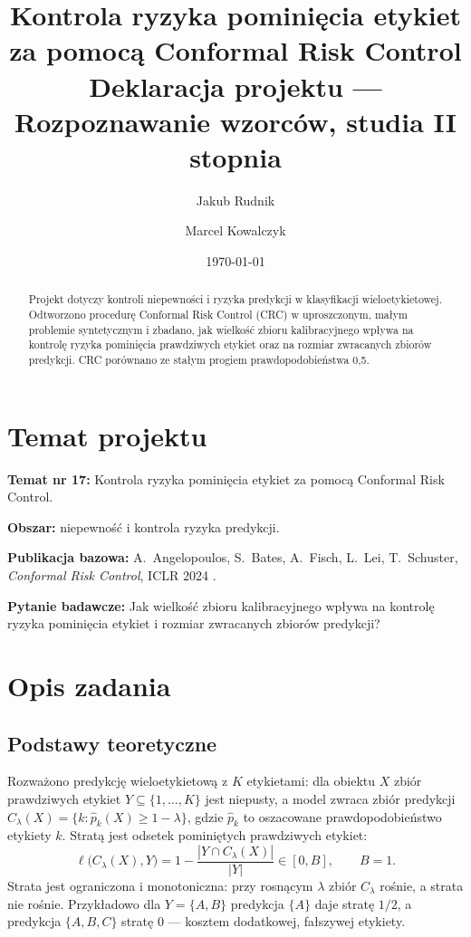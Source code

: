 \documentclass[10pt]{article}
\newcommand{\autorA}{{Jakub Rudnik}}
\newcommand{\autorB}{{Marcel Kowalczyk}}
\begin{document}
\title{Kontrola ryzyka pominięcia etykiet za pomocą Conformal Risk Control\\[0.5em]
\large Deklaracja projektu --- Rozpoznawanie wzorców, studia II stopnia}
\author{\autorA \and \autorB}
\date{\today}

\maketitle

\begin{abstract}

Projekt dotyczy kontroli niepewności i ryzyka predykcji w klasyfikacji wieloetykietowej.
Odtworzono procedurę Conformal Risk Control (CRC) \cite{CRC} w uproszczonym, małym
problemie syntetycznym i zbadano, jak wielkość zbioru kalibracyjnego wpływa na kontrolę
ryzyka pominięcia prawdziwych etykiet oraz na rozmiar zwracanych zbiorów predykcji.
CRC porównano ze stałym progiem prawdopodobieństwa 0{,}5.

\end{abstract}

\pagebreak

\section{Temat projektu}

\textbf{Temat nr 17:} Kontrola ryzyka pominięcia etykiet za pomocą Conformal Risk Control.

\noindent\textbf{Obszar:} niepewność i kontrola ryzyka predykcji.

\noindent\textbf{Publikacja bazowa:} A.~Angelopoulos, S.~Bates, A.~Fisch, L.~Lei,
T.~Schuster, \emph{Conformal Risk Control}, ICLR 2024 \cite{CRC}.

\noindent\textbf{Pytanie badawcze:} Jak wielkość zbioru kalibracyjnego wpływa na kontrolę
ryzyka pominięcia etykiet i rozmiar zwracanych zbiorów predykcji?

\section{Opis zadania}

\subsection{Podstawy teoretyczne}

Rozważono predykcję wieloetykietową z $K$ etykietami: dla obiektu $X$ zbiór prawdziwych
etykiet $Y \subseteq \{1,\dots,K\}$ jest niepusty, a model zwraca zbiór predykcji
$C_\lambda(X) = \{k : \hat p_k(X) \ge 1-\lambda\}$, gdzie $\hat p_k$ to oszacowane
prawdopodobieństwo etykiety $k$. Stratą jest odsetek pominiętych prawdziwych etykiet:
\[
  \ell\bigl(C_\lambda(X), Y\bigr) = 1 - \frac{|Y \cap C_\lambda(X)|}{|Y|} \in [0, B], \qquad B = 1 .
\]
Strata jest ograniczona i monotoniczna: przy rosnącym $\lambda$ zbiór $C_\lambda$ rośnie,
a strata nie rośnie. Przykładowo dla $Y=\{A,B\}$ predykcja $\{A\}$ daje stratę $1/2$,
a predykcja $\{A,B,C\}$ stratę $0$ --- kosztem dodatkowej, fałszywej etykiety.
\end{document}
